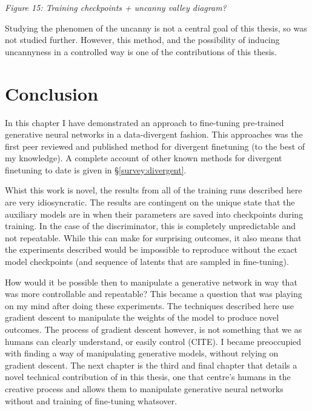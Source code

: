 \textit{Figure 15: Training checkpoints + uncanny valley diagram?}

Studying the phenomen of the uncanny is not a central goal of this thesis, so was not studied further.
However, this method, and the possibility of inducing uncannyness in a controlled way is one of the contributions of this thesis. 

\section{Conclusion}

In this chapter I have demonstrated an approach to fine-tuning pre-trained generative neural networks in a data-divergent fashion.
This approaches was the first peer reviewed and published method for divergent finetuning (to the best of my knowledge).
A complete account of other known methods for divergent finetuning to date is given in \S \ref{survey:divergent}.

Whist this work is novel, the results from all of the training runs described here are very idiosyncratic. 
The results are contingent on the unique state that the auxiliary models are in when their parameters are saved into checkpoints during training. 
In the case of the discriminator, this is completely unpredictable and not repeatable. 
While this can make for surprising outcomes, it also means that the experiments described would be impossible to reproduce without the exact model checkpoints (and sequence of latents that are sampled in fine-tuning).

How would it be possible then to manipulate a generative network in way that was more controllable and repeatable?
This became a question that was playing on my mind after doing these experiments. 
The techniques described here use gradient descent to manipulate the weights of the model to produce novel outcomes. 
The process of gradient descent however, is not something that we as humans can clearly understand, or easily control (CITE).
I became preoccupied with finding a way of manipulating generative models, without relying on gradient descent. 
The next chapter is the third and final chapter that details a novel technical contribution of in this thesis, one that centre's humans in the creative process and allows them to manipulate generative neural networks without and training of fine-tuning whatsover.
